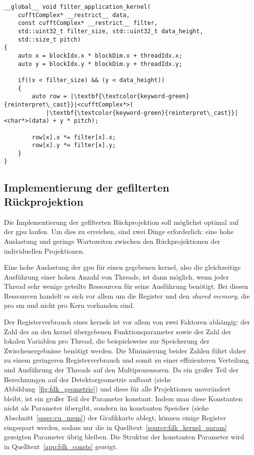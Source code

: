 \begin{code}
\begin{verbatim}
__global__ void filter_application_kernel(
    cufftComplex* __restrict__ data,
    const cufftComplex* __restrict__ filter,
    std::uint32_t filter_size, std::uint32_t data_height,
    std::size_t pitch)
{
    auto x = blockIdx.x * blockDim.x + threadIdx.x;
    auto y = blockIdx.y * blockDim.y + threadIdx.y;

    if((x < filter_size) && (y < data_height))
    {
        auto row = |\textbf{\textcolor{keyword-green}{reinterpret\_cast}}|<cufftComplex*>(
            |\textbf{\textcolor{keyword-green}{reinterpret\_cast}}|<char*>(data) + y * pitch);

        row[x].x *= filter[x].x;
        row[x].y *= filter[x].y;
    }
}
\end{verbatim}
\label{source:impl_filter}
\end{code}

\subsection{Implementierung der gefilterten Rückprojektion}

Die Implementierung der gefilterten Rückprojektion soll möglichst optimal auf der \gls{gpu} laufen. Um dies zu
erreichen, sind zwei Dinge erforderlich: eine hohe Auslastung und geringe Wartezeiten zwischen den Rückprojektionen
der individuellen Projektionen.

Eine hohe Auslastung der \gls{gpu} für einen gegebenen \gls{kernel}, also die gleichzeitige Ausführung einer hohen
Anzahl von Threads, ist dann möglich, wenn jeder Thread sehr wenige geteilte Ressourcen für seine Ausführung benötigt.
Bei diesen Ressourcen handelt es sich vor allem um die Register und den \textit{shared memory}, die pro \gls{sm} und
nicht pro Kern vorhanden sind.

Der Registerverbrauch eines \gls{kernel}s ist vor allem von zwei Faktoren abhängig: der Zahl der an den \gls{kernel}
übergebenen Funktionsparameter sowie der Zahl der lokalen Variablen pro Thread, die beispielsweise zur Speicherung der
Zwischenergebnisse benötigt werden. Die Minimierung beider Zahlen führt daher zu einem geringeren Registerverbrauch und
somit zu einer effizienteren Verteilung und Ausführung der Threads auf den Multiprozessoren. Da ein großer Teil der
Berechnungen auf der Detektorgeometrie aufbaut (siehe Abbildung~\ref{fig:fdk_geometrie}) und diese für alle Projektionen
unverändert bleibt, ist ein großer Teil der Parameter konstant. Indem man diese Konstanten nicht als Parameter übergibt,
sondern im konstanten Speicher (siehe Abschnitt~\ref{sssec:cu_mem}) der Grafikkarte ablegt, können einige Register
eingespart werden, sodass nur die in Quelltext~\ref{source:fdk_kernel_param} gezeigten Parameter übrig bleiben. Die
Struktur der konstanten Parameter wird in Quelltext~\ref{app:fdk_consts} gezeigt.

